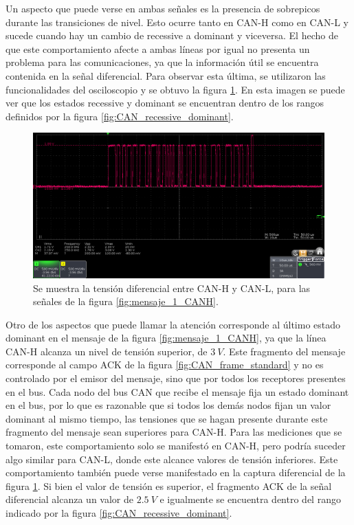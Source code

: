 Un aspecto que puede verse en ambas señales es la presencia de sobrepicos durante las transiciones de nivel. Esto ocurre tanto en CAN-H como en CAN-L y sucede cuando hay un cambio de recessive a dominant y viceversa. El hecho de que este comportamiento afecte a ambas líneas por igual no presenta un problema para las comunicaciones, ya que la información útil se encuentra contenida en la señal diferencial. Para observar esta última, se utilizaron las funcionalidades del osciloscopio y se obtuvo la figura \ref{fig:mensaje_1_diff}. En esta imagen se puede ver que los estados recessive y dominant se encuentran dentro de los rangos definidos por la figura \ref{fig:CAN_recessive_dominant}.

\begin{figure}[H]
    \centering
    \includegraphics[width=\textwidth]{img/mensaje_1_diff.png}
    \caption{Se muestra la tensión diferencial entre CAN-H y CAN-L, para las señales de la figura \ref{fig:mensaje_1_CANH}.}
    \label{fig:mensaje_1_diff}
\end{figure}

Otro de los aspectos que puede llamar la atención corresponde al último estado dominant en el mensaje de la figura \ref{fig:mensaje_1_CANH}, ya que la línea CAN-H alcanza un nivel de tensión superior, de $3 \ V$. Este fragmento del mensaje corresponde al campo ACK de la figura \ref{fig:CAN_frame_standard} y no es controlado por el emisor del mensaje, sino que por todos los receptores presentes en el bus. Cada nodo del bus CAN que recibe el mensaje fija un estado dominant en el bus, por lo que es razonable que si todos los demás nodos fijan un valor dominant al mismo tiempo, las tensiones que se hagan presente durante este fragmento del mensaje sean superiores para CAN-H. Para las mediciones que se tomaron, este comportamiento solo se manifestó en CAN-H, pero podría suceder algo similar para CAN-L, donde este alcance valores de tensión inferiores. Este comportamiento también puede verse manifestado en la captura diferencial de la figura \ref{fig:mensaje_1_diff}. Si bien el valor de tensión es superior, el fragmento ACK de la señal diferencial alcanza un valor de $2.5 \ V$ e igualmente se encuentra dentro del rango indicado por la figura \ref{fig:CAN_recessive_dominant}.

